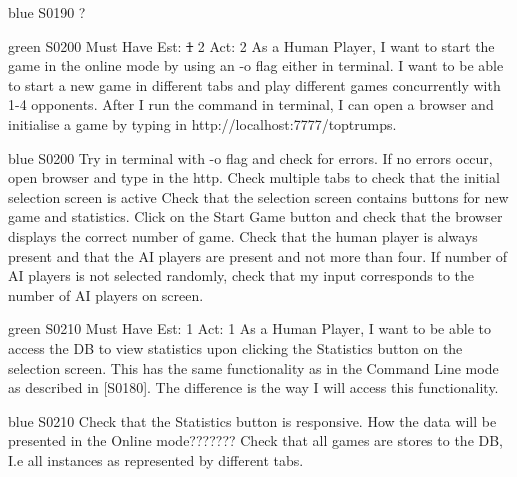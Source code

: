 \begin{card}{blue}
{S0190}{}{}{}
?
\end{card}


\newpage

\begin{card}{green}
{S0200}
{Must Have}
{Est: \st{1} 2}
{Act: 2}
As a Human Player, I want to start the game in the online mode by using an -o flag either in terminal.  
I want to be able to start a new game in different tabs and play different games concurrently with 1-4 opponents. 
After I run the command in terminal, I can open a browser and initialise a game by typing in http://localhost:7777/toptrumps.
\end{card}

\begin{card}{blue}
{S0200}{}{}{}
Try in terminal with -o flag and check for errors. 
If no errors occur, open browser and type in the http.
Check multiple tabs to check that the initial selection screen is active Check that the selection screen contains buttons for new game and statistics.
Click on the Start Game button and check that the browser displays the correct number of game. 
Check that the human player is always present and that the AI players are present and not more than four. 
If number of AI players is not selected randomly, check that my input corresponds to the number of AI players on screen.
\end{card}


\newpage

\begin{card}{green}
{S0210}
{Must Have}
{Est: 1}
{Act: 1}
As a Human Player, I want to be able to access the DB to view statistics upon clicking the Statistics button on the selection screen.
This has the same functionality as in the Command Line mode as described in [S0180].
The difference is the way I will access this functionality.
\end{card}

\begin{card}{blue}
{S0210}{}{}{}
Check that the Statistics button is responsive. 
How the data will be presented in the Online mode???????
Check that all games are stores to the DB, I.e all instances as represented by different tabs.
\end{card}


